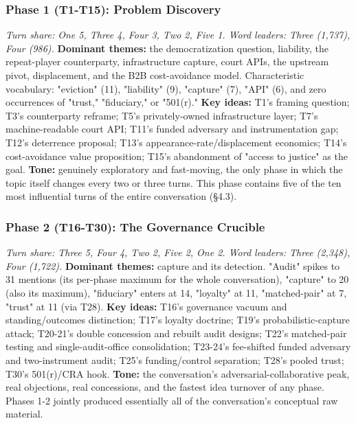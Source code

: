 \documentclass[sigconf,nonacm=true]{acmart}
\begin{document}
\subsubsection{Phase 1 (T1-T15): Problem Discovery}
\textit{Turn share: One 5, Three 4, Four 3, Two 2, Five 1. Word leaders: Three (1,737), Four (986).}
\textbf{Dominant themes:} the democratization question, liability, the repeat-player counterparty, infrastructure capture, court APIs, the upstream pivot, displacement, and the B2B cost-avoidance model. Characteristic vocabulary: "eviction" (11), "liability" (9), "capture" (7), "API" (6),  and zero occurrences of "trust," "fiduciary," or "501(r)."
\textbf{Key ideas:} T1's framing question; T3's counterparty reframe; T5's privately-owned infrastructure layer; T7's machine-readable court API; T11's funded adversary and instrumentation gap; T12's deterrence proposal; T13's appearance-rate/displacement economics; T14's cost-avoidance value proposition; T15's abandonment of "access to justice" as the goal.
\textbf{Tone:} genuinely exploratory and fast-moving,  the only phase in which the topic itself changes every two or three turns. This phase contains five of the ten most influential turns of the entire conversation (§4.3).

\subsubsection{Phase 2 (T16-T30): The Governance Crucible}
\textit{Turn share: Three 5, Four 4, Two 2, Five 2, One 2. Word leaders: Three (2,348), Four (1,722).}
\textbf{Dominant themes:} capture and its detection. "Audit" spikes to 31 mentions (its per-phase maximum for the whole conversation), "capture" to 20 (also its maximum), "fiduciary" enters at 14, "loyalty" at 11, "matched-pair" at 7, "trust" at 11 (via T28).
\textbf{Key ideas:} T16's governance vacuum and standing/outcomes distinction; T17's loyalty doctrine; T19's probabilistic-capture attack; T20-21's double concession and rebuilt audit designs; T22's matched-pair testing and single-audit-office consolidation; T23-24's fee-shifted funded adversary and two-instrument audit; T25's funding/control separation; T28's pooled trust; T30's 501(r)/CRA hook.
\textbf{Tone:} the conversation's adversarial-collaborative peak,  real objections, real concessions, and the fastest idea turnover of any phase. Phases 1-2 jointly produced essentially all of the conversation's conceptual raw material.
\end{document}
